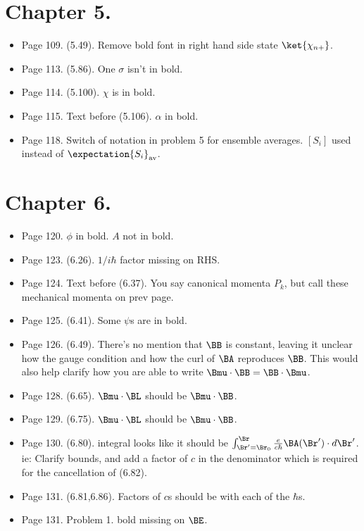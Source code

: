 \section{Chapter 5.}
\begin{itemize}
\item Page 109.  (5.49). Remove bold font in right hand side state $\ket{\chi_{n+}}$.
\item Page 113.  (5.86). One $\sigma$ isn't in bold.
\item Page 114.  (5.100). $\chi$ is in bold.
\item Page 115.  Text before (5.106). $\alpha$ in bold.
\item Page 118.  Switch of notation in problem 5 for ensemble averages.  $[S_i]$ used instead of $\expectation{S_i}_{\text{av}}$.
\end{itemize}

\section{Chapter 6.}
\begin{itemize}
\item Page 120.  $\phi$ in bold.  $A$ not in bold.
\item Page 123.  (6.26).  $1/i \hbar$ factor missing on RHS.
\item Page 124.  Text before (6.37).  You say canonical momenta $P_k$, but call these mechanical momenta on prev page.
\item Page 125.  (6.41).  Some $\psi$s are in bold.
\item Page 126.  (6.49).  There's no mention that $\BB$ is constant, leaving it unclear how the gauge condition and how the curl of $\BA$ reproduces $\BB$.  This would also help clarify how you are able to write $\Bmu \cdot \BB = \BB \cdot \Bmu$.
\item Page 128.  (6.65).  $\Bmu \cdot \BL$ should be $\Bmu \cdot \BB$.
\item Page 129.  (6.75).  $\Bmu \cdot \BL$ should be $\Bmu \cdot \BB$.
\item Page 130.  (6.80).  integral looks like it should be $\int_{\Br' = \Br_0}^\Br \frac{e}{c \hbar} \BA(\Br') \cdot d\Br'$.  ie: Clarify bounds, and add a factor of $c$ in the denominator which is required for the cancellation of (6.82).
\item Page 131.  (6.81,6.86).  Factors of $c$s should be with each of the $\hbar$s.
\item Page 131.  Problem 1.  bold missing on $\BE$.
\end{itemize}

